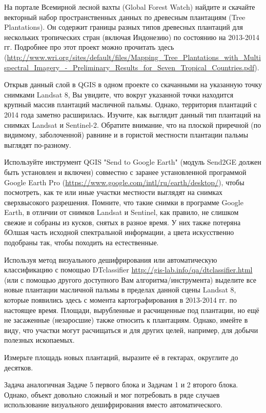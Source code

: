 
На портале Всемирной лесной вахты (Global Forest Watch) найдите 
и скачайте векторный набор пространственных данных по древесным плантациям (Tree \linebreak Plantations). Он 
содержит границы разных типов древесных плантаций для нескольких тропических стран (включая Индонезию) 
по состоянию на 2013-2014 гг. Подробнее про этот проект можно прочитать здесь (\url{http://www.wri.org/sites/default/files/Mapping_Tree_Plantations_with_Multispectral_Imagery_-_Preliminary_}\linebreak \url{Results_for_Seven_Tropical_Countries.pdf}).

Открыв данный слой в QGIS в одном проекте со скачанными на указанную точку снимками Landsat 8, Вы увидите, что вокруг указанной точки находится крупный массив плантаций масличной пальмы. Однако, территория плантаций с 2014 года заметно расширилась. Изучите, как выглядит данный тип плантаций на снимках Landsat и Sentinel-2. Обратите внимание, что на плоской приречной (по видимому, заболоченной) равнине и в гористой местности плантации пальмы выглядят по-разному.

Используйте инструмент QGIS "Send to Google Earth" (модуль Send2GE должен быть установлен и включен) 
совместно с заранее установленной программой Google Earth Pro (\url{https://www.google.com/intl/ru/earth/desktop/}), чтобы посмотреть, как те или иные участки местности выглядят на снимках сверхвысокого разрешения. Помните, что такие снимки в программе Google Earth, в отличии от снимков Landsat и Sentinel, как правило, не слишком свежие и собраны из кусков, снятых в разное время. У них также потеряна бОлшая часть исходной спектральной информации, а цвета искусственно подобраны так, чтобы походить на естественные.

Используя метод визуального дешифрирования или автоматическую классификацию с помощью DTclassifier \url{http://gis-lab.info/qa/dtclassifier.html} (или с помощью другого доступного Вам алгоритма/инструмента) выделите все новые плантации масличной пальмы в пределах данной сцены Landsat 8, которые появились здесь с момента картографирования в 2013-2014 гг. по настоящее время. Площади, вырубленные и расчищенные под плантации, но ещё не засаженные (незаросшие) также относить к плантациям. Однако, имейте в виду, что участки могут расчищаться и для других целей, например, для добычи полезных ископаемых.

Измерьте площадь новых плантаций, выразите её в гектарах, округлите до десятков.

\explanationSection

Задача аналогичная Задаче 5 первого блока и Задачам 1 и 2 второго блока. Однако, объект довольно сложный и мог потребовать в ряде случаев использование визуального дешифрирования вместо автоматического.

